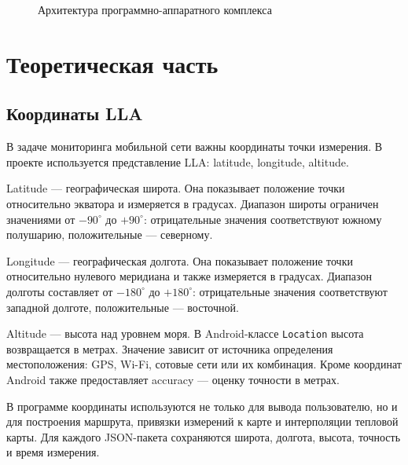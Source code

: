 \documentclass[14pt,a4paper]{extarticle}
\begin{document}
\begin{figure}[H]
\caption{Архитектура программно-аппаратного комплекса}
\label{fig:architecture}
\end{figure}

\section{Теоретическая часть}

\subsection{Координаты LLA}

В задаче мониторинга мобильной сети важны координаты точки измерения. В проекте используется представление LLA: latitude, longitude, altitude.

Latitude --- географическая широта. Она показывает положение точки относительно экватора и измеряется в градусах. Диапазон широты ограничен значениями от $-90^\circ$ до $+90^\circ$: отрицательные значения соответствуют южному полушарию, положительные --- северному.

Longitude --- географическая долгота. Она показывает положение точки относительно нулевого меридиана и также измеряется в градусах. Диапазон долготы составляет от $-180^\circ$ до $+180^\circ$: отрицательные значения соответствуют западной долготе, положительные --- восточной.

Altitude --- высота над уровнем моря. В Android-классе \texttt{Location} высота возвращается в метрах. Значение зависит от источника определения местоположения: GPS, Wi-Fi, сотовые сети или их комбинация. Кроме координат Android также предоставляет accuracy --- оценку точности в метрах.

В программе координаты используются не только для вывода пользователю, но и для построения маршрута, привязки измерений к карте и интерполяции тепловой карты. Для каждого JSON-пакета сохраняются широта, долгота, высота, точность и время измерения.
\end{document}
